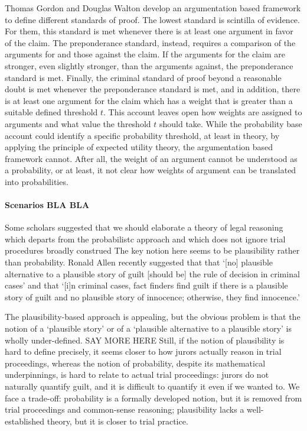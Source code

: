 \documentclass[10pt]{article}
\begin{document}
Thomas Gordon and Douglas Walton develop an argumentation based framework to define different standards of proof. The lowest standard is  scintilla of evidence. For them, this standard is met whenever there is at least one argument in favor of the claim. The preponderance standard, instead, requires a comparison of the arguments for and those against the claim. If the arguments for the claim are stronger, even slightly stronger, than the arguments against, the preponderance standard is met. Finally, the criminal standard of proof beyond a reasonable doubt is met whenever the preponderance standard is met, and in addition, there is at least one argument for the claim which has a weight that is greater than a suitable defined threshold $t$. This account leaves open how weights are assigned to arguments and what value the threshold $t$ should take. While the probability base account could identify a specific probability threshold, at least in theory, by applying the principle of expected utility theory, the argumentation based framework cannot. After all, the weight of an argument cannot be understood as a probability, or at least, it not clear how weights of argument can be translated into probabilities.



\paragraph{Scenarios BLA BLA}



Some scholars suggested that we should elaborate a 
theory of legal reasoning which departs from the 
probabilistc approach and which does not ignore trial procedures broadly construed
The key notion here seems to be plausibility rather than probability.
Ronald Allen recently suggested that that 
`[no] plausible alternative to a plausible story of guilt [should be] the rule of decision in criminal cases'
and that `[i]n criminal cases, fact finders find guilt if there is a plausible story of guilt and 
no plausible story of innocence; otherwise, they find innocence.'

The plausibility-based approach is appealing, but the obvious problem is that the notion of a `plausible story' or 
of a `plausible alternative to a plausible story' is wholly under-defined. 
SAY MORE HERE
Still, if the notion of plausibility is hard to define precisely, it seems closer to how jurors actually 
reason in trial proceedings, whereas the notion of probability, despite its 
mathematical underpinnings, is hard to relate to actual trial proceedings: jurors do not 
naturally quantify guilt, and it is difficult to quantify it 
even if we wanted to. We face a trade-off: probability is a formally developed notion, but it is 
removed from trial proceedings and common-sense reasoning; plausibility 
lacks a well-established theory, but it is closer to trial practice. 
\end{document}
